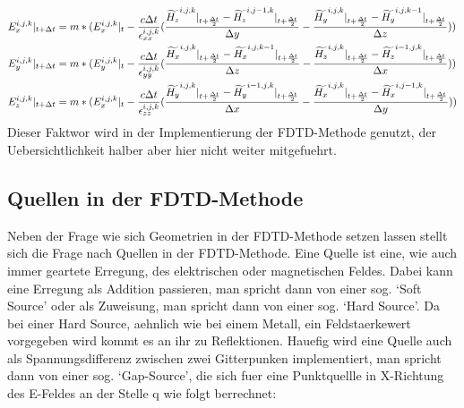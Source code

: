 \documentclass[11pt, ngerman]{article}
\begin{document}
\begin{align}
	\Ef{x}{i,j,k}{+} &= m*(\Ef{x}{i,j,k}{0} - \frac{c\Delta t}{\epsilon_{xx}^{i,j,k}}(\frac{\Hf{z}{i,j,k}{+} - \Hf{z}{i,j-1,k}{+}}{\Delta y} - \frac{\Hf{y}{i,j,k}{+} - \Hf{y}{i,j,k-1}{+}}{\Delta z}))\\
	\Ef{y}{i,j,k}{+} &= m*(\Ef{y}{i,j,k}{0} - \frac{c\Delta t}{\epsilon_{yy}^{i,j,k}}(\frac{\Hf{x}{i,j,k}{+} - \Hf{x}{i,j,k-1}{+}}{\Delta z} - \frac{\Hf{z}{i,j,k}{+} - \Hf{z}{i-1,j,k}{+}}{\Delta x}))\\
	\Ef{z}{i,j,k}{+} &= m*(\Ef{x}{i,j,k}{0} - \frac{c\Delta t}{\epsilon_{zz}^{i,j,k}}(\frac{\Hf{y}{i,j,k}{+} - \Hf{y}{i-1,j,k}{+}}{\Delta x} - \frac{\Hf{x}{i,j,k}{+} - \Hf{x}{i,j-1,k}{+}}{\Delta y}))
\end{align}
Dieser Faktwor wird in der Implementierung der FDTD-Methode genutzt, der Uebersichtlichkeit halber aber hier nicht
weiter mitgefuehrt.

\subsection{Quellen in der FDTD-Methode}
Neben der Frage wie sich Geometrien in der FDTD-Methode setzen lassen stellt sich die Frage nach Quellen in der FDTD-Methode.
Eine Quelle ist eine, wie auch immer geartete Erregung, des elektrischen oder magnetischen Feldes.
Dabei kann eine Erregung als Addition passieren, man spricht dann von einer sog. `Soft Source' oder als Zuweisung,
man spricht dann von einer sog. `Hard Source'.\cite{sources}
Da bei einer Hard Source, aehnlich wie bei einem Metall, ein Feldstaerkewert vorgegeben
wird kommt es an ihr zu Reflektionen. Hauefig wird eine Quelle auch als Spannungsdifferenz
zwischen zwei Gitterpunken implementiert, man spricht dann von einer sog. `Gap-Source',
die sich fuer eine Punktquellle in X-Richtung des E-Feldes an der Stelle q 
wie folgt berrechnet\cite{advanced_gap_feed}:
\end{document}
